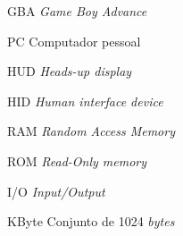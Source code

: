 \begin{siglas}
  \item[GBA] \textit{Game Boy Advance}
  \item[PC] Computador pessoal
  \item[HUD] \textit{Heads-up display}
  \item[HID] \textit{Human interface device}
  \item[RAM] \textit{Random Access Memory}
  \item[ROM] \textit{Read-Only memory}
  \item[I/O] \textit{Input/Output}
  \item[KByte] Conjunto de 1024 \textit{bytes}
\end{siglas}
